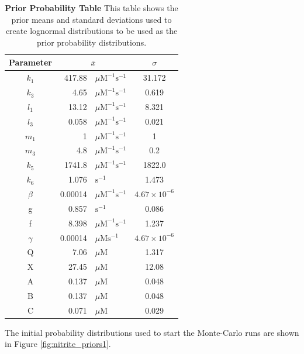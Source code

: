 \begin{table}[ht]%
\renewcommand{\arraystretch}{1.5}
\begin{center}
\begin{tabular}{crlc}
\toprule
\textbf{Parameter} & \multicolumn{2}{c}{${\bar{x}}$} & $\sigma$\\
\midrule
$k_1$ & 417.88 & $\mu \mathrm{M}^{-1}\mathrm{s}^{-1}$ & 31.172\\
$k_3$ & 4.65 & $\mu \mathrm{M}^{-1}\mathrm{s}^{-1}$ & 0.619\\
$l_1$ & 13.12 & $\mu \mathrm{M}^{-1}\mathrm{s}^{-1}$ & 8.321\\
$l_3$ & 0.058 & $\mu \mathrm{M}^{-1}\mathrm{s}^{-1}$ & 0.021\\
$m_1$ & 1 & $\mu \mathrm{M}^{-1}\mathrm{s}^{-1}$ & 1\\
$m_3$ & 4.8 & $\mu \mathrm{M}^{-1}\mathrm{s}^{-1}$ & 0.2\\
$k_5$ & 1741.8 & $\mu \mathrm{M}^{-1}\mathrm{s}^{-1}$ & 1822.0\\
$k_6$ & 1.076 & $\mathrm{s}^{-1}$ & 1.473\\
$\beta$ & 0.00014 & $\mu \mathrm{M}^{-1}\mathrm{s}^{-1}$ & $4.67\times 10^{-6}$\\
g & 0.857 & $\mathrm{s}^{-1}$ & 0.086\\
f & 8.398 & $\mu \mathrm{M}^{-1}\mathrm{s}^{-1}$ & 1.237\\
$\gamma$ & 0.00014 & $\mu \mathrm{M}\mathrm{s}^{-1}$ & $4.67\times 10^{-6}$\\
Q & 7.06 & $\mu \mathrm{M}$ & 1.317\\
X & 27.45 & $\mu \mathrm{M}$ & 12.08\\
A & 0.137 & $\mu \mathrm{M}$ & 0.048\\
B & 0.137 & $\mu \mathrm{M}$ & 0.048\\
C & 0.071 & $\mu \mathrm{M}$ & 0.029\\
\bottomrule
\end{tabular}
\end{center}
\caption[Prior Probability Table]{{\bf Prior Probability Table} This table shows the prior means and standard deviations used to create lognormal distributions to be used as the prior probability distributions.
\label{tab:nitrite_prior_table}}
\end{table}

The initial probability distributions used to start the Monte-Carlo runs are shown in Figure \ref{fig:nitrite_priors1}.

